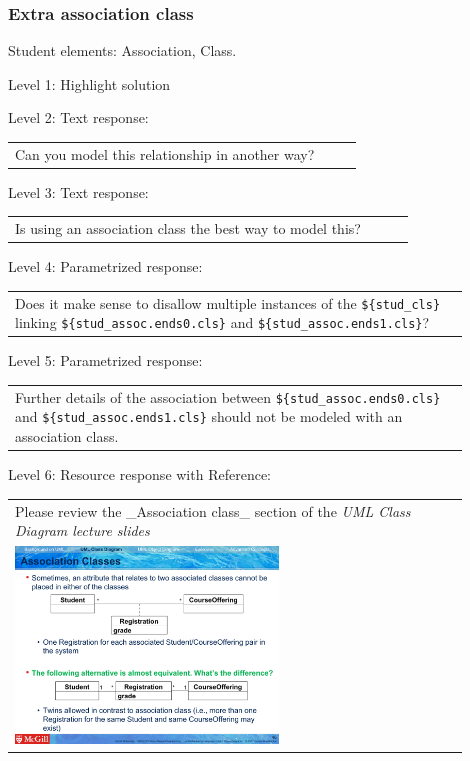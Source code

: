 \subsubsection{Extra association class}

Student elements: Association, Class.  \medskip

\noindent Level 1: Highlight solution  \medskip

\noindent Level 2: Text response: \medskip

\begin{tabular}{|p{0.9\linewidth}}
Can you model this relationship in another way?
\end{tabular} \medskip

\noindent Level 3: Text response: \medskip

\begin{tabular}{|p{0.9\linewidth}}
Is using an association class the best way to model this?
\end{tabular} \medskip

\noindent Level 4: Parametrized response: \medskip

\begin{tabular}{|p{0.9\linewidth}}
Does it make sense to disallow multiple instances of the \verb|${stud_cls}| linking \verb|${stud_assoc.ends0.cls}| and \verb|${stud_assoc.ends1.cls}|?
\end{tabular} \medskip

\noindent Level 5: Parametrized response: \medskip

\begin{tabular}{|p{0.9\linewidth}}
Further details of the association between \verb|${stud_assoc.ends0.cls}| and \verb|${stud_assoc.ends1.cls}| should not be modeled with an association class.
\end{tabular} \medskip

\noindent Level 6: Resource response with Reference: \medskip

\begin{tabular}{|p{0.9\linewidth}}
Please review the _Association class_ section of the
\textit{UML Class Diagram lecture slides}

\\
\includegraphics[width=0.6\textwidth]{images/association_class.png}
\end{tabular} \medskip


